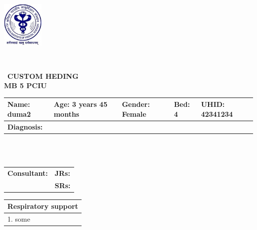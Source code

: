 \documentclass{article}
\begin{document}
\
\noindent
\begin{minipage}{0.2\textwidth} %
    \includegraphics[width=2cm]{RESOURCES/AIIMS_LOGO.png} %
\end{minipage}\
\vspace{-1cm} %
\hfill
\fontsize{7pt}{9pt}\selectfont %
\begin{center}\
    \textbf{CUSTOM HEDING} \\
    \textbf{MB 5 PCIU} \\
\end{center}
\fontsize{8pt}{9pt}\selectfont %
\noindent\begin{tabular}{|p{5cm}|p{4cm}|p{2.5cm}|p{1.5cm}|p{3cm}|}
    \hline
    \textbf{Name:} duma2 & \textbf{Age:} 3 years 45 months & \textbf{Gender:} Female & \textbf{Bed:} 4 & \textbf{UHID:} 42341234 \\
    \hline
    \multicolumn{5}{|p{19cm}|}{\textbf{Diagnosis:}  }\\
    \hline
\end{tabular}
\\
\\
\noindent\begin{tabular}{|p{11.3cm}|p{7.3cm}|}
     \hline
    \textbf{Consultant:}       & \textbf{JRs:}  \\
    \cline{2-2}
      & \textbf{SRs:}  \\
    \hline
\end{tabular}
\vspace{0.1cm} %
\noindent
\begin{minipage}[t]{0.45\textwidth}
\vspace{-1.50cm} %

    

    \begin{tabular}{|p{12cm}|}
        \hline
        \textbf{Respiratory support} \\
        \hline
       1. some \\
        \hline
    \end{tabular}
    \vspace{0.2cm}

\end{minipage}%
\end{document}
